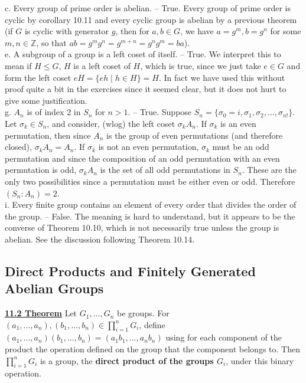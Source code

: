 \documentclass[12pt, letterpaper]{article}
\begin{document}
c. Every group of prime order is abelian. -- True. Every group of prime order is cyclic by corollary 10.11 and every cyclic group is abelian by a previous theorem (if $G$ is cyclic with generator $g$, then for $a,b \in G$, we have $a = g^m, b = g^n$ for some $m,n \in \mathbb{Z}$, so that $ab = g^mg^n = g^{m+n} = g^ng^m = ba$). \\

e. A subgroup of a group is a left coset of itself. -- True. We interpret this to mean if $H \leq G$, $H$ is a left coset of $H$, which is true, since we just take $e \in G$ and form the left coset $eH = \{eh \; | \; h \in H\} = H$. In fact we have used this without proof quite a bit in the exercises since it seemed clear, but it does not hurt to give some justification. \\

g. $A_n$ is of index 2 in $S_n$ for $n > 1$. -- True. Suppose $S_n = \{\sigma_0 = i, \sigma_1, \sigma_2, ..., \sigma_{n!}\}$. Let $\sigma_k \in S_n$, and consider, (wlog) the left coset $\sigma_kA_n$. If $\sigma_k$ is an even permutation, then since $A_n$ is the group of even permutations (and therefore closed), $\sigma_kA_n = A_n$. If $\sigma_k$ is not an even permutation, $\sigma_k$ must be an odd permutation and since the composition of an odd permutation with an even permutation is odd, $\sigma_kA_n$ is the set of all odd permutations in $S_n$. These are the only two possibilities since a permutation must be either even or odd. Therefore $(S_n : A_n) = 2$. \\

i. Every finite group contains an element of every order that divides the order of the group. -- False. The meaning is hard to understand, but it appears to be the converse of Theorem 10.10, which is not necessarily true unless the group is abelian. See the discussion following Theorem 10.14. \\

\subsection{Direct Products and Finitely Generated Abelian Groups}
\noindent \underline{\bf 11.2 Theorem} Let $G_1,...,G_n$ be groups. For $(a_1,...,a_n),(b_1,...,b_n) \in \prod_{i=1}^{n} G_i$, define $(a_1,...,a_n)(b_1,...,b_n) = (a_1b_1,...,a_nb_n)$ using for each component of the product the operation defined on the group that the component belongs to. Then $\prod_{i=1}^{n} G_i$ is a group, the {\bf direct product of the groups $G_i$}, under this binary operation. \\
\end{document}
